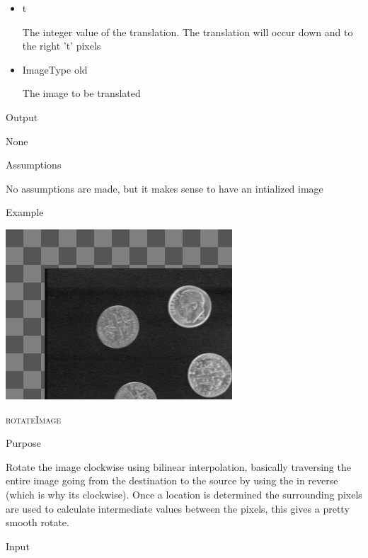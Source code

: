 \documentclass[pdftex, 11pt]{article}
\begin{document}
\begin{description}
\begin{description}
\begin{itemize}
					\item{t}

						The integer value of the translation. The
						translation will occur down and 
						to the right 't' pixels

					\item{ImageType old}

						The image to be translated

				\end{itemize}

			\item{Output}

				None

			\item{Assumptions}

				No assumptions are made, but it makes sense to have
				an intialized image

			\item{Example}

				\includegraphics{images/outtrans.png}

		\end{description}


	\item{\textsc{rotateImage}}
		\begin{description}
			\item{Purpose}

				Rotate the image clockwise using bilinear
				interpolation, basically traversing
				the entire image going from the destination 
				to the source by using the
				in reverse (which is why its clockwise). 
				Once a location is determined the
				surrounding pixels are used to calculate 
				intermediate values between the
				pixels, this gives a pretty smooth rotate.

			\item{Input}

				\begin{itemize}


\end{itemize}
\end{description}
\end{description}
\end{document}
